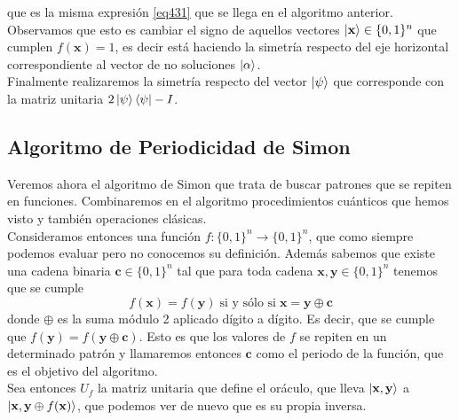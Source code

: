 \documentclass[a4paper]{article}
\numberwithin{equation}{section}
\begin{document}
que es la misma expresión \ref{eq431} que se llega en el algoritmo anterior. Observamos que esto es cambiar el signo de aquellos vectores $\ket{\mathbf{x}}\in\{0,1\}^n$ que cumplen $f(\mathbf{x}) = 1$, es decir está haciendo la simetría respecto del eje horizontal correspondiente al vector de no soluciones $\ket{\alpha}$.\\
\linebreak
Finalmente realizaremos la simetría respecto del vector $\ket{\psi}$ que corresponde con la matriz unitaria $2\ket{\psi}\bra{\psi} - I$.

\newpage

\subsection{Algoritmo de Periodicidad de Simon}
Veremos ahora el algoritmo de Simon que trata de buscar patrones que se repiten en funciones. Combinaremos en el algoritmo procedimientos cuánticos que hemos visto y también operaciones clásicas.\\
\linebreak
Consideramos entonces una función $f:\{0,1\}^n \longrightarrow \{0,1\}^n$, que como siempre podemos evaluar pero no conocemos su definición. Además sabemos que existe una cadena binaria $\mathbf{c} \in \{0,1\}^n$ tal que para toda cadena $\mathbf{x},\mathbf{y}\in\{0,1\}^n$ tenemos que se cumple
\begin{equation}
f(\mathbf{x}) = f(\mathbf{y}) \; \text{si y sólo si} \; \mathbf{x} = \mathbf{y}\oplus \mathbf{c}
\end{equation}
donde $\oplus$ es la suma módulo 2 aplicado dígito a dígito. Es decir, que se cumple que $f(\mathbf{y}) = f(\mathbf{y}\oplus\mathbf{c})$. Esto es que los valores de $f$ se repiten en un determinado patrón y llamaremos entonces $\mathbf{c}$ como el periodo de la función, que es el objetivo del algoritmo.\\
\linebreak
Sea entonces $U_f$ la matriz unitaria que define el oráculo, que lleva $\ket{\mathbf{x}, \mathbf{y}}$ a $\ket{\mathbf{x}, \mathbf{y}\oplus f(\mathbf{x})}$, que podemos ver de nuevo que es su propia inversa. 
\end{document}
